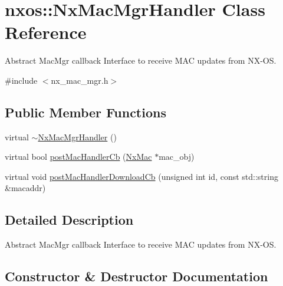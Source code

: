\hypertarget{classnxos_1_1_nx_mac_mgr_handler}{}\section{nxos\+:\+:Nx\+Mac\+Mgr\+Handler Class Reference}
\label{classnxos_1_1_nx_mac_mgr_handler}


Abstract Mac\+Mgr callback Interface to receive M\+AC updates from N\+X-\/\+OS.  




{\ttfamily \#include $<$nx\+\_\+mac\+\_\+mgr.\+h$>$}

\subsection*{Public Member Functions}
\begin{DoxyCompactItemize}
\item 
virtual \mbox{\hyperlink{classnxos_1_1_nx_mac_mgr_handler_a4eef592d5890b37c3d26faf679aefbb2}{$\sim$\+Nx\+Mac\+Mgr\+Handler}} ()
\item 
virtual bool \mbox{\hyperlink{classnxos_1_1_nx_mac_mgr_handler_a3a15935d8cd001a554d32a5d7ab216b5}{post\+Mac\+Handler\+Cb}} (\mbox{\hyperlink{classnxos_1_1_nx_mac}{Nx\+Mac}} $\ast$mac\+\_\+obj)
\item 
virtual void \mbox{\hyperlink{classnxos_1_1_nx_mac_mgr_handler_a42d84c9f4da1211024912efd4416827e}{post\+Mac\+Handler\+Download\+Cb}} (unsigned int id, const std\+::string \&macaddr)
\end{DoxyCompactItemize}


\subsection{Detailed Description}
Abstract Mac\+Mgr callback Interface to receive M\+AC updates from N\+X-\/\+OS. 

\subsection{Constructor \& Destructor Documentation}
\mbox{\label{classnxos_1_1_nx_mac_mgr_handler_a4eef592d5890b37c3d26faf679aefbb2}} 
